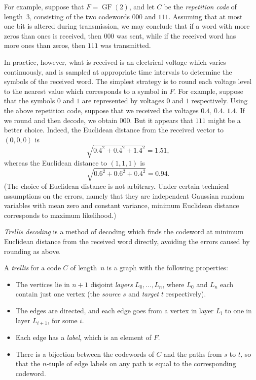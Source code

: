 \documentclass[12pt]{article}
\newcommand{\GF}{\mathop{\mathrm{GF}}}
\begin{document}
For example, suppose that $F=\GF(2)$, and let $C$ be the
\emph{repetition code} of length~$3$, consisting of the two
codewords $000$ and $111$. Assuming that at most one bit is
altered during transmission, we may conclude that if a word
with more zeros than ones is received, then $000$ was sent, while
if the received word has more ones than zeros, then $111$ was
transmitted.

In practice, however, what is received is an electrical voltage
which varies continuously, and is sampled at appropriate time
intervals to determine the symbols of the received word. The
simplest strategy is to round each voltage level to the nearest
value which corresponds to a symbol in $F$. For example, suppose
that the symbols $0$ and $1$ are represented by voltages $0$ and
$1$ respectively. Using the above repetition code, suppose that
we received the voltages $0.4$, $0.4$. $1.4$. If we round and
then decode, we obtain $000$. But it appears that $111$ might be
a better choice. Indeed, the Euclidean distance from the
received vector to $(0,0,0)$ is
\[\sqrt{0.4^2+0.4^2+1.4^2}=1.51,\]
whereas the Euclidean distance to $(1,1,1)$ is
\[\sqrt{0.6^2+0.6^2+0.4^2}=0.94.\]
(The choice of Euclidean distance is not arbitrary. Under certain
technical assumptions on the errors, namely that they are
independent Gaussian random variables with mean zero and constant
variance, minimum Euclidean distance corresponds to maximum
likelihood.)

\medbreak

\emph{Trellis decoding} is a method of decoding which finds the
codeword at minimum Euclidean distance from the received word
directly, avoiding the errors caused by rounding as above.

A \emph{trellis} for a code $C$ of length~$n$ is a graph with
the following properties:
\begin{itemize}
\item The vertices lie in $n+1$ disjoint \emph{layers} $L_0,
\ldots, L_n$, where $L_0$ and $L_n$ each contain just one vertex
(the \emph{source} $s$ and \emph{target} $t$ respectively).
\item The edges are directed, and each edge goes from a vertex
in layer $L_i$ to one in layer $L_{i+1}$, for some $i$.
\item Each edge has a \emph{label}, which is an element of $F$.
\item There is a bijection between the codewords of $C$ and the
paths from $s$ to $t$, so that the $n$-tuple of edge labels on
any path is equal to the corresponding codeword.
\end{itemize}
\end{document}
